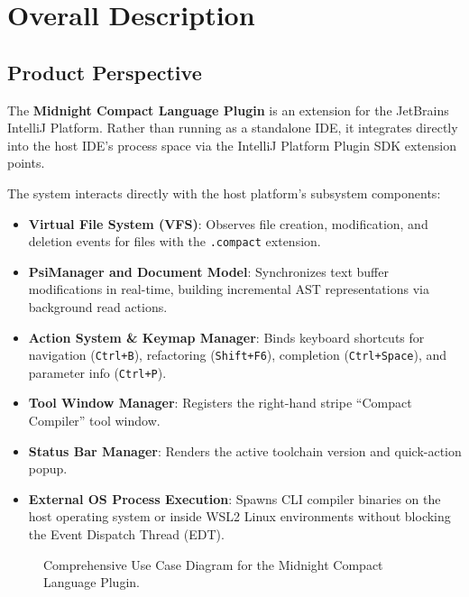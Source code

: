 \section{Overall Description}
\label{sec:overall_description}

\subsection{Product Perspective}
The \textbf{Midnight Compact Language Plugin} is an extension for the JetBrains IntelliJ Platform. Rather than running as a standalone IDE, it integrates directly into the host IDE's process space via the IntelliJ Platform Plugin SDK extension points.

The system interacts directly with the host platform's subsystem components:
\begin{itemize}
    \item \textbf{Virtual File System (VFS)}: Observes file creation, modification, and deletion events for files with the \texttt{.compact} extension.
    \item \textbf{PsiManager and Document Model}: Synchronizes text buffer modifications in real-time, building incremental AST representations via background read actions.
    \item \textbf{Action System \& Keymap Manager}: Binds keyboard shortcuts for navigation (\texttt{Ctrl+B}), refactoring (\texttt{Shift+F6}), completion (\texttt{Ctrl+Space}), and parameter info (\texttt{Ctrl+P}).
    \item \textbf{Tool Window Manager}: Registers the right-hand stripe ``Compact Compiler'' tool window.
    \item \textbf{Status Bar Manager}: Renders the active toolchain version and quick-action popup.
    \item \textbf{External OS Process Execution}: Spawns CLI compiler binaries on the host operating system or inside WSL2 Linux environments without blocking the Event Dispatch Thread (EDT).
\end{itemize}

\begin{figure}[htbp]
    \centering
    
    \caption{Comprehensive Use Case Diagram for the Midnight Compact Language Plugin.}
    \label{fig:use_case_diagram}
\end{figure}

